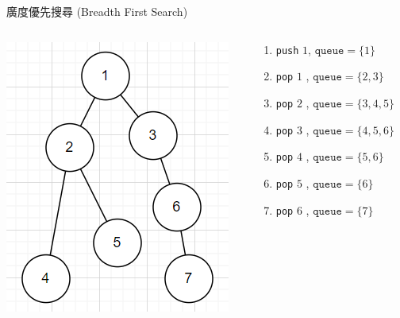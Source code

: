 \documentclass[aspectratio=169]{beamer}
\begin{document}
    \begin{frame}{廣度優先搜尋 (Breadth First Search)}
        \begin{columns}
            \begin{column}{0.5\textwidth}
                \begin{center}
                    \includegraphics[scale=0.5]{images/BFS.png}
                \end{center}
            \end{column}
            \begin{column}{0.5\textwidth}
                \begin{enumerate}
                    \item \texttt{push} $1$, $\mathtt{queue} = \{1\}$ 
                    \item \texttt{pop} $1$ , $\mathtt{queue} = \{2,3\}$
                    \item \texttt{pop} $2$ , $\mathtt{queue} = \{3,4,5\}$
                    \item \texttt{pop} $3$ , $\mathtt{queue} = \{4,5,6\}$
                    \item \texttt{pop} $4$ , $\mathtt{queue} = \{5,6\}$
                    \item \texttt{pop} $5$ , $\mathtt{queue} = \{6\}$
                    \item \texttt{pop} $6$ , $\mathtt{queue} = \{7\}$
                \end{enumerate}
            \end{column}
        \end{columns}
    \end{frame}
    
\end{document}
